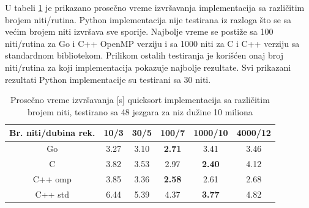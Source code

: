 \documentclass[12pt,oneside]{memoir}
\begin{document}
U tabeli \ref{tab:qs5} je prikazano prosečno vreme izvršavanja implementacija sa različitim brojem niti/rutina. Python implementacija nije testirana iz razloga što se sa većim brojem niti izvršava sve sporije. Najbolje vreme se postiže sa 100 niti/rutina za Go i C++ OpenMP verziju i sa 1000 niti za C i C++ verziju sa standardnom bibliotekom.  Prilikom ostalih testiranja je korišćen onaj broj niti/rutina za koji implementacija pokazuje najbolje rezultate. Svi prikazani rezultati Python implementacije su testirani sa 30 niti. 

\begin{table}
\begin{center}
\caption{Prosečno vreme izvršavanja [s] quicksort implementacija sa različitim brojem niti, testirano sa 48 jezgara za niz dužine 10 miliona}
\begin{tabular}{||c||c c c c c||}
\hline
Br. niti/dubina rek.&10/3 &30/5 &100/7 &1000/10 &4000/12 \\ \hline
Go		&3.27	&3.10	&\textbf{2.71}	&3.41			&3.46\\ \hline
C		&3.82	&3.53	&2.97			&\textbf{2.40}	&4.12\\ \hline
C++ omp 	&3.85	&3.36	&\textbf{2.58}	&2.61			&2.68\\ \hline
C++ std 	&6.44	&5.39	&4.37			&\textbf{3.77}	&4.82\\ 
\hline
\end{tabular}
\label{tab:qs5}
\end{center}
\end{table}
\end{document}
